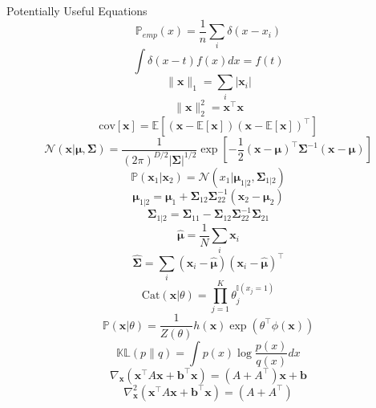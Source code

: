 \documentclass[letter, 12pt]{article}
\begin{document}
\newpage 


\begin{center}
    Potentially Useful Equations\\

    \[
        \mathbb{P}_{emp}(x) = \frac{1}{n}\sum_i \delta(x - x_i)
    \]
    \[
        \int \delta(x-t)f(x)dx = f(t)
    \]
    \[
        \|\mathbf{x}\|_1 = \sum_i |\mathbf{x}_i|
    \]
    \[
        \|\mathbf{x}\|_2^2 = \mathbf{x}^\top\mathbf{x}
    \]
    \[
        \mathrm{cov}[\mathbf{x}] = \mathbb{E}\left[(\mathbf{x} - \mathbb{E}[\mathbf{x}])(\mathbf{x} - \mathbb{E}[\mathbf{x}])^\top\right]
    \]
    \[
        \mathcal{N}(\mathbf{x}|\boldsymbol{\mu},\mathbf{\Sigma}) = \frac{1}{(2\pi)^{D/2}|\mathbf{\Sigma}|^{1/2}}\exp\left[-\frac{1}{2}(\mathbf{x} - \boldsymbol{\mu})^\top\mathbf{\Sigma}^{-1}(\mathbf{x} - \boldsymbol{\mu})\right]
    \]
    \[
        \mathbb{P}(\mathbf{x}_1|\mathbf{x}_2) = \mathcal{N}(x_1|\boldsymbol{\mu}_{1|2},\mathbf{\Sigma}_{1|2})
    \]
    \[
        \boldsymbol{\mu}_{1|2} = \boldsymbol{\mu}_1 + \mathbf{\Sigma}_{12}\mathbf{\Sigma}_{22}^{-1}(\mathbf{x}_2 - \boldsymbol{\mu}_2)
    \]
    \[
        \mathbf{\Sigma}_{1|2} = \mathbf{\Sigma}_{11} - \mathbf{\Sigma}_{12}\mathbf{\Sigma}_{22}^{-1}\mathbf{\Sigma}_{21}
    \]
    \[
        \hat{\boldsymbol{\mu}} = \frac{1}{N}\sum_i \mathbf{x}_i
    \]
    \[
        \hat{\mathbf{\Sigma}} = \sum_i (\mathbf{x}_i - \hat{\boldsymbol{\mu}})(\mathbf{x}_i - \hat{\boldsymbol{\mu}})^\top
    \]
    \[
        \mathrm{Cat}(\mathbf{x}|\theta) = \prod_{j=1}^K \theta_j^{\mathbb{I}(x_j = 1)}
    \]
    \[
        \mathbb{P}(\mathbf{x}|\theta) = \frac{1}{Z(\theta)}h(\mathbf{x})\exp\left(\theta^\top \phi(\mathbf{x})\right)
    \]
    \[
        \mathbb{KL}(p\|q) = \int p(x)\log\frac{p(x)}{q(x)}dx
    \]
    \[
        \nabla_\mathbf{x}\left(\mathbf{x}^\top A\mathbf{x} + \mathbf{b}^\top\mathbf{x}\right) = (A + A^\top)\mathbf{x} + \mathbf{b}
    \]
    \[
        \nabla^2_\mathbf{x}\left(\mathbf{x}^\top A\mathbf{x} + \mathbf{b}^\top\mathbf{x}\right) = (A + A^\top)
    \]
\end{center}
\newpage
\end{document}
